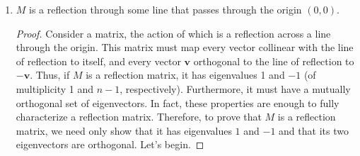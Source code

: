 \documentclass[../psets.tex]{subfiles}
\begin{document}
\begin{enumerate}
\begin{enumerate}
\begin{enumerate}
\begin{proof}
\begin{align*}
\begin{pmatrix}
                        -b & a\\
                        a & b\\
                    \end{pmatrix}
                    \begin{pmatrix}
                        -b & a\\
                        a & b\\
                    \end{pmatrix}\\
                    &=
                    \begin{pmatrix}
                        (-b)(-b)+(a)(a) & (-b)(a)+(a)(b)\\
                        (a)(-b)+(b)(a) & (a)(a)+(b)(b)\\
                    \end{pmatrix}\\
                    &=
                    \begin{pmatrix}
                        a^2+b^2 & ab-ab\\
                        ab-ab & a^2+b^2\\
                    \end{pmatrix}\\
                    &=
                    \begin{pmatrix}
                        1 & 0\\
                        0 & 1\\
                    \end{pmatrix}\\
                    &= I
                \end{align*}
                as desired.
            \end{proof}
            \item $M$ is a reflection through some line that passes through the origin $(0,0)$.
            \begin{proof}
                Consider a matrix, the action of which is a reflection across a line through the origin. This matrix must map every vector collinear with the line of reflection to itself, and every vector $\mathbf{v}$ orthogonal to the line of reflection to $-\mathbf{v}$. Thus, if $M$ is a reflection matrix, it has eigenvalues 1 and $-1$ (of multiplicity 1 and $n-1$, respectively). Furthermore, it must have a mutually orthogonal set of eigenvectors. In fact, these properties are enough to fully characterize a reflection matrix. Therefore, to prove that $M$ is a reflection matrix, we need only show that it has eigenvalues $1$ and $-1$ and that its two eigenvectors are orthogonal. Let's begin.\par

\end{proof}
\end{enumerate}
\end{enumerate}
\end{enumerate}
\end{document}
